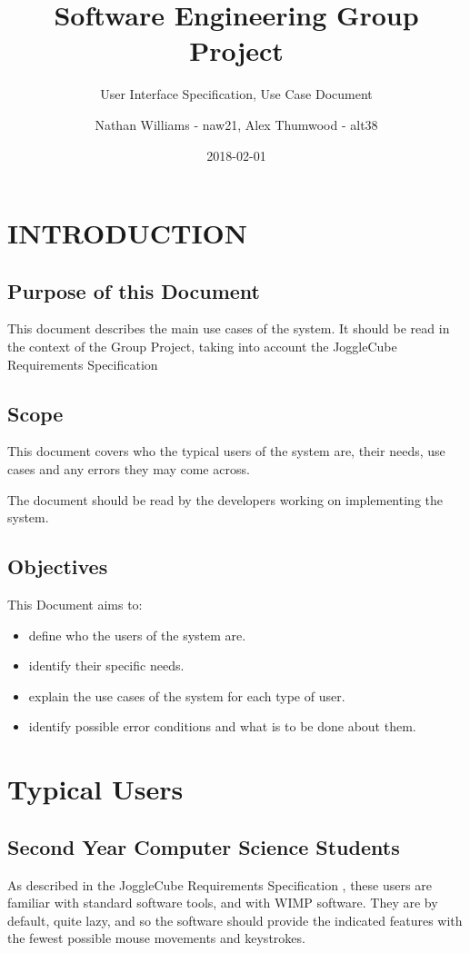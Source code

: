 \documentclass{project}
\begin{document}
\title{Software Engineering Group Project}
\subtitle{User Interface Specification, Use Case Document}
\author{Nathan Williams - naw21, Alex Thumwood - alt38}     
\date{2018-02-01}
\maketitle
\tableofcontents
\newpage
\section{INTRODUCTION}

\subsection{Purpose of this Document}

This document describes the main use cases of the system. It should be read in the context of the Group Project, taking into account the JoggleCube Requirements Specification \cite{SE.QA.CSRS}

\subsection{Scope}

This document covers who the typical users of the system are, their needs, use cases and any errors they may come across.

The document should be read by the developers working on implementing the system.

\subsection{Objectives}
This Document aims to:
\begin{itemize}
	\item define who the users of the system are.
	\item identify their specific needs.
	\item explain the use cases of the system for each type of user.
	\item identify possible error conditions and what is to be done about them.
\end{itemize}

\section{Typical Users}
\subsection{Second Year Computer Science Students}
	As described in the JoggleCube Requirements Specification \cite{SE.QA.CSRS}, these users are familiar with standard software tools, and with WIMP software. They are by default, quite lazy, and so the software should provide the indicated features with the fewest possible mouse movements and keystrokes.
\end{document}
